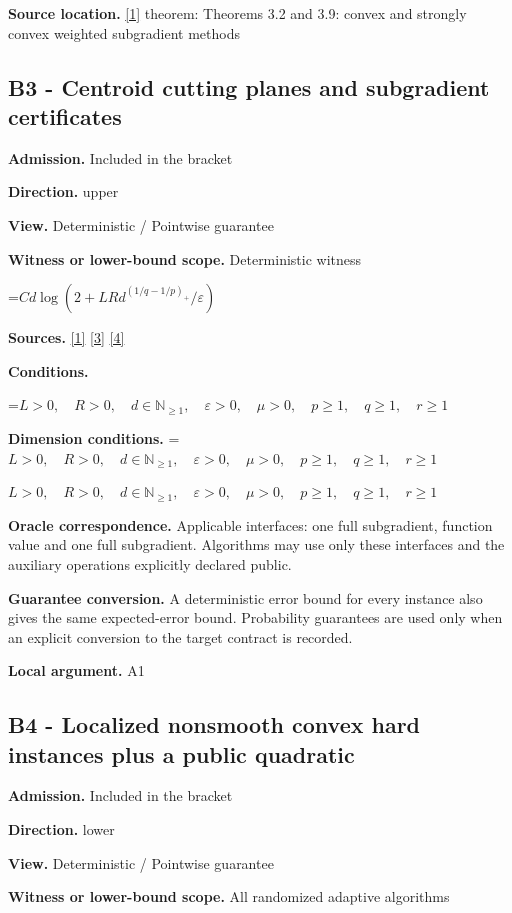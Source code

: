 \documentclass[10pt,a4paper]{article}
\newcommand{\AtlasMath}[1]{\par\begingroup\centering\setbox0=\hbox{$\displaystyle #1$}\ifdim\wd0>1.4\linewidth\typeout{ATLAS WIDE FORMULA: \the\wd0}\fi\ifdim\wd0>\linewidth\resizebox{\linewidth}{!}{\box0}\else\box0\fi\par\endgroup}
\newcommand{\AtlasInlineMath}[1]{\begingroup\setbox0=\hbox{$#1$}\ifdim\wd0>.4\linewidth\endgroup\AtlasMath{#1}\else\endgroup$#1$\fi}
\begin{document}
\textbf{Source location.} \href{https://arxiv.org/pdf/1405.4980}{[1]} theorem: Theorems 3.2 and 3.9: convex and strongly convex weighted subgradient methods

\subsection{B3 - Centroid cutting planes and subgradient certificates}
\textbf{Admission.} Included in the bracket

\textbf{Direction.} upper

\textbf{View.} Deterministic / Pointwise guarantee

\textbf{Witness or lower-bound scope.} Deterministic witness

\AtlasMath{C d\log(2+LRd^{(1/q-1/p)_+}/\varepsilon)}
\textbf{Sources.} \href{https://arxiv.org/pdf/1405.4980}{[1]} \href{https://www2.isye.gatech.edu/~nemirovs/MOR_AccuracyCertificates.pdf}{[3]} \href{https://arxiv.org/pdf/2609.20701}{[4]}

\textbf{Conditions.} 
\AtlasMath{L>0,\quad R>0,\quad d\in\mathbb{N}_{\ge1},\quad \varepsilon>0,\quad \mu>0,\quad p\ge1,\quad q\ge1,\quad r\ge1}


\textbf{Dimension conditions.} \AtlasInlineMath{L>0,\quad R>0,\quad d\in\mathbb{N}_{\ge1},\quad \varepsilon>0,\quad \mu>0,\quad p\ge1,\quad q\ge1,\quad r\ge1}

\textbf{Oracle correspondence.} Applicable interfaces: one full subgradient, function value and one full subgradient. Algorithms may use only these interfaces and the auxiliary operations explicitly declared public.

\textbf{Guarantee conversion.} A deterministic error bound for every instance also gives the same expected-error bound. Probability guarantees are used only when an explicit conversion to the target contract is recorded.

\textbf{Local argument.} A1

\subsection{B4 - Localized nonsmooth convex hard instances plus a public quadratic}
\textbf{Admission.} Included in the bracket

\textbf{Direction.} lower

\textbf{View.} Deterministic / Pointwise guarantee

\textbf{Witness or lower-bound scope.} All randomized adaptive algorithms
\end{document}
